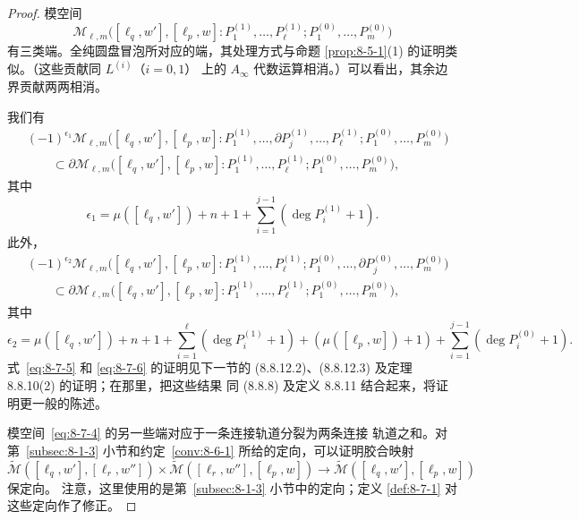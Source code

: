 \begin{proof}
模空间
\begin{equation}
 \mathcal M_{\ell,m}
 \bigl([\ell_q,w'],[\ell_p,w]:
 P_1^{(1)},\ldots,P_\ell^{(1)};
 P_1^{(0)},\ldots,P_m^{(0)}\bigr)
 \tag{8.7.4}\label{eq:8-7-4}
\end{equation}
有三类端。全纯圆盘冒泡所对应的端，其处理方式与命题
\ref{prop:8-5-1}(1) 的证明类似。（这些贡献同 $L^{(i)}$（$i=0,1$）
上的 $A_\infty$ 代数运算相消。）可以看出，其余边界贡献两两相消。

我们有
\begin{equation}
\begin{aligned}
 &(-1)^{\epsilon_1}
 \mathcal M_{\ell,m}
 \bigl([\ell_q,w'],[\ell_p,w]:
 P_1^{(1)},\ldots,\partial P_j^{(1)},\ldots,P_\ell^{(1)};
 P_1^{(0)},\ldots,P_m^{(0)}\bigr)\\
 &\qquad\subset
 \partial\mathcal M_{\ell,m}
 \bigl([\ell_q,w'],[\ell_p,w]:
 P_1^{(1)},\ldots,P_\ell^{(1)};
 P_1^{(0)},\ldots,P_m^{(0)}\bigr),
\end{aligned}
\tag{8.7.5}\label{eq:8-7-5}
\end{equation}
其中
\[
 \epsilon_1=\mu([\ell_q,w'])+n+1
 +\sum_{i=1}^{j-1}(\deg P_i^{(1)}+1).
\]
此外，
\begin{equation}
\begin{aligned}
 &(-1)^{\epsilon_2}
 \mathcal M_{\ell,m}
 \bigl([\ell_q,w'],[\ell_p,w]:
 P_1^{(1)},\ldots,P_\ell^{(1)};
 P_1^{(0)},\ldots,\partial P_j^{(0)},\ldots,P_m^{(0)}\bigr)\\
 &\qquad\subset
 \partial\mathcal M_{\ell,m}
 \bigl([\ell_q,w'],[\ell_p,w]:
 P_1^{(1)},\ldots,P_\ell^{(1)};
 P_1^{(0)},\ldots,P_m^{(0)}\bigr),
\end{aligned}
\tag{8.7.6}\label{eq:8-7-6}
\end{equation}
其中
\[
 \epsilon_2=\mu([\ell_q,w'])+n+1
 +\sum_{i=1}^{\ell}(\deg P_i^{(1)}+1)
 +(\mu([\ell_p,w])+1)
 +\sum_{i=1}^{j-1}(\deg P_i^{(0)}+1).
\]
式~\eqref{eq:8-7-5} 和
\eqref{eq:8-7-6} 的证明见下一节的
(8.8.12.2)、(8.8.12.3) 及定理 8.8.10(2) 的证明；在那里，把这些结果
同 (8.8.8) 及定义 8.8.11 结合起来，将证明更一般的陈述。

模空间~\eqref{eq:8-7-4} 的另一些端对应于一条连接轨道分裂为两条连接
轨道之和。对第~\ref{subsec:8-1-3} 小节和约定~\ref{conv:8-6-1}
所给的定向，可以证明胶合映射
\[
 \widetilde{\mathcal M}([\ell_q,w'],[\ell_r,w''])
 \times
 \widetilde{\mathcal M}([\ell_r,w''],[\ell_p,w])
 \longrightarrow
 \widetilde{\mathcal M}([\ell_q,w'],[\ell_p,w])
\]
保定向。%
注意，这里使用的是第~\ref{subsec:8-1-3} 小节中的定向；定义
\ref{def:8-7-1} 对这些定向作了修正。


\end{proof}
